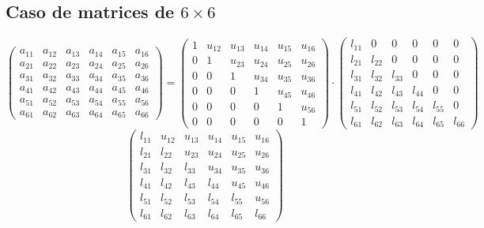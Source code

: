 \documentclass[10pt,a4paper,dvipdfmx]{article}
\begin{document}
\subsection{Caso de matrices de $6\times 6$ }
$$ \left( 
\begin{array}{cccccc}
a_{{1}{1}} & a_{{1}{2}} & a_{{1}{3}} & a_{{1}{4}} & a_{{1}{5}} & a_{{1}{6}} \\
a_{{2}{1}} & a_{{2}{2}} & a_{{2}{3}} & a_{{2}{4}} & a_{{2}{5}} & a_{{2}{6}} \\
a_{{3}{1}} & a_{{3}{2}} & a_{{3}{3}} & a_{{3}{4}} & a_{{3}{5}} & a_{{3}{6}} \\
a_{{4}{1}} & a_{{4}{2}} & a_{{4}{3}} & a_{{4}{4}} & a_{{4}{5}} & a_{{4}{6}} \\
a_{{5}{1}} & a_{{5}{2}} & a_{{5}{3}} & a_{{5}{4}} & a_{{5}{5}} & a_{{5}{6}} \\
a_{{6}{1}} & a_{{6}{2}} & a_{{6}{3}} & a_{{6}{4}} & a_{{6}{5}} & a_{{6}{6}} 
 \end{array}
\right)
 = \left( 
\begin{array}{cccccc}
1 & u_{{1}{2}} & u_{{1}{3}} & u_{{1}{4}} & u_{{1}{5}} & u_{{1}{6}} \\
0 & 1 & u_{{2}{3}} & u_{{2}{4}} & u_{{2}{5}} & u_{{2}{6}} \\
0 & 0 & 1 & u_{{3}{4}} & u_{{3}{5}} & u_{{3}{6}} \\
0 & 0 & 0 & 1 & u_{{4}{5}} & u_{{4}{6}} \\
0 & 0 & 0 & 0 & 1 & u_{{5}{6}} \\
0 & 0 & 0 & 0 & 0 & 1 
 \end{array}
\right)
 \cdot \left( 
\begin{array}{cccccc}
l_{{1}{1}} & 0 & 0 & 0 & 0 & 0 \\
l_{{2}{1}} & l_{{2}{2}} & 0 & 0 & 0 & 0 \\
l_{{3}{1}} & l_{{3}{2}} & l_{{3}{3}} & 0 & 0 & 0 \\
l_{{4}{1}} & l_{{4}{2}} & l_{{4}{3}} & l_{{4}{4}} & 0 & 0 \\
l_{{5}{1}} & l_{{5}{2}} & l_{{5}{3}} & l_{{5}{4}} & l_{{5}{5}} & 0 \\
l_{{6}{1}} & l_{{6}{2}} & l_{{6}{3}} & l_{{6}{4}} & l_{{6}{5}} & l_{{6}{6}} 
 \end{array}
\right)
 $$
$$ \left( 
\begin{array}{cccccc}
l_{{1}{1}} & u_{{1}{2}} & u_{{1}{3}} & u_{{1}{4}} & u_{{1}{5}} & u_{{1}{6}} \\
l_{{2}{1}} & l_{{2}{2}} & u_{{2}{3}} & u_{{2}{4}} & u_{{2}{5}} & u_{{2}{6}} \\
l_{{3}{1}} & l_{{3}{2}} & l_{{3}{3}} & u_{{3}{4}} & u_{{3}{5}} & u_{{3}{6}} \\
l_{{4}{1}} & l_{{4}{2}} & l_{{4}{3}} & l_{{4}{4}} & u_{{4}{5}} & u_{{4}{6}} \\
l_{{5}{1}} & l_{{5}{2}} & l_{{5}{3}} & l_{{5}{4}} & l_{{5}{5}} & u_{{5}{6}} \\
l_{{6}{1}} & l_{{6}{2}} & l_{{6}{3}} & l_{{6}{4}} & l_{{6}{5}} & l_{{6}{6}} 
 \end{array}
\right)
 $$
\end{document}

